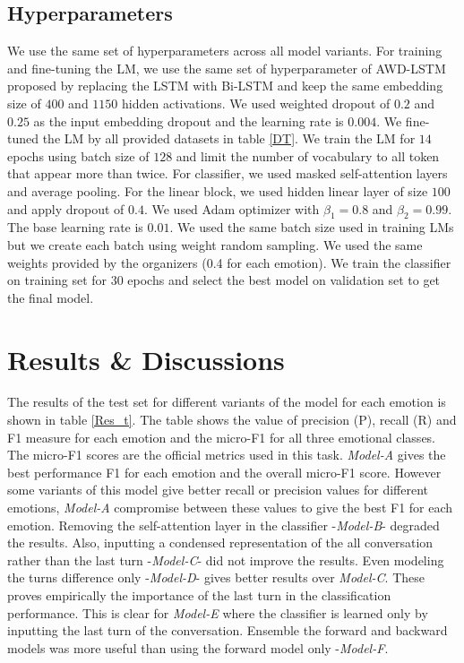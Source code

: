 \documentclass{article}
\begin{document}
\subsection{Hyperparameters}
We use the same set of hyperparameters across all model variants. For training and fine-tuning the LM, we use the same set of hyperparameter of AWD-LSTM proposed by \cite{meri_1} replacing the LSTM with Bi-LSTM and keep the same embedding size of $400$ and $1150$ hidden activations. We used weighted dropout of $0.2$ and $0.25$ as the input embedding dropout and the learning rate is $0.004$. We fine-tuned the LM by all provided datasets in table \ref{DT}. We train the LM for $14$ epochs using batch size of $128$ and limit the number of vocabulary to all token that appear more than twice. 
 For classifier, we used masked self-attention layers and average pooling. For the linear block, we used hidden linear layer of size $100$ and apply dropout of $0.4$. We used Adam optimizer \cite{adam} with $\beta_1=0.8$ and $\beta_2=0.99$. The base learning rate is $0.01$. We used the same batch size used in training LMs but we create each batch using weight random sampling. We used the same weights provided by the organizers 
(0.4 for each emotion). We train the classifier on training set for 30 epochs and select the best model on validation set to get the final model.


\section{Results \& Discussions}\label{XPR}
The results of the test set for different variants of the model for each emotion is shown in table \ref{Res_t}. The table shows the value of precision (P), recall (R) and F1 measure for each emotion and the micro-F1 for all three emotional classes. The micro-F1 scores are the official metrics used in this task. \textit{Model-A} gives the best performance F1 for each emotion and the overall micro-F1 score. However some variants of this model give better recall or precision values for different emotions, \textit{Model-A} compromise between these values to give the best F1 for each emotion. Removing the self-attention layer in the classifier -\textit{Model-B}- degraded the results. Also, inputting a condensed representation of the all conversation rather than the last turn -\textit{Model-C}- did not improve the results. Even modeling the turns difference only -\textit{Model-D}- gives better results over \textit{Model-C}. These proves empirically the importance of the last turn in the classification performance. This is clear for \textit{Model-E} where the classifier is learned only by inputting the last turn of the conversation. Ensemble the forward and backward models was more useful than using the forward model only -\textit{Model-F}.
\end{document}
